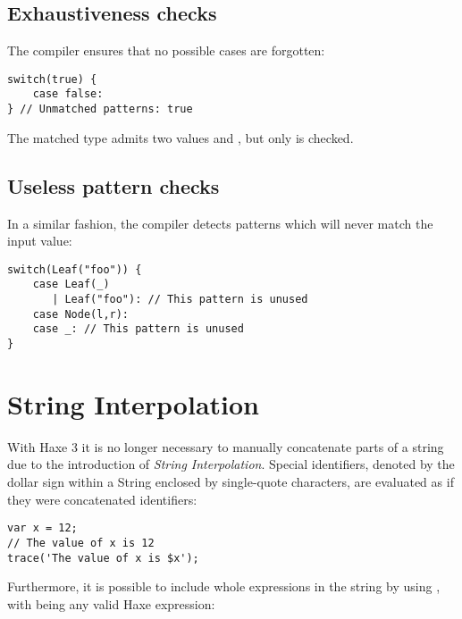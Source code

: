 \subsection{Exhaustiveness checks}
\label{lf-pattern-matching-exhaustiveness}

The compiler ensures that no possible cases are forgotten:

\begin{lstlisting}
switch(true) {
    case false:
} // Unmatched patterns: true
\end{lstlisting}

The matched type  admits two values  and , but only  is checked. 




\subsection{Useless pattern checks}
\label{lf-pattern-matching-unused}

In a similar fashion, the compiler detects patterns which will never match the input value:

\begin{lstlisting}
switch(Leaf("foo")) {
    case Leaf(_)
       | Leaf("foo"): // This pattern is unused
    case Node(l,r):
    case _: // This pattern is unused
}
\end{lstlisting}



\section{String Interpolation}
\label{lf-string-interpolation}

With Haxe 3 it is no longer necessary to manually concatenate parts of a string due to the introduction of \emph{String Interpolation}. Special identifiers, denoted by the dollar sign \expr{\$} within a String enclosed by single-quote  characters, are evaluated as if they were concatenated identifiers:

\begin{lstlisting}
var x = 12;
// The value of x is 12
trace('The value of x is $x');
\end{lstlisting}
Furthermore, it is possible to include whole expressions in the string by using , with  being any valid Haxe expression:

